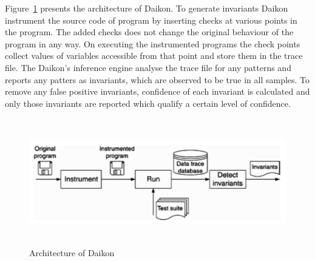 Figure~\ref{fig:daikon} presents the architecture of Daikon. To generate invariants Daikon instrument the source code of  program by inserting checks at various points in the program. The added checks does not change the original behaviour of the program in any way. On executing the instrumented programs the check points collect values of variables accessible from that point and store them in the trace file. The Daikon's inference engine analyse the trace file for any patterns and reports any patters as invariants, which are observed to be true in all samples. To remove any false positive invariants, confidence of each invariant is calculated and only those invariants are reported which qualify a certain level of confidence. 

\bigskip
\begin{figure}[H]
\centering
\includegraphics[width= 15.5cm,height=5.5cm]{chapter7/daikon.png}
\bigskip
\caption{Architecture of Daikon~\cite{ernst2001dynamically}}
\label{fig:daikon}
\end{figure}
\bigskip

